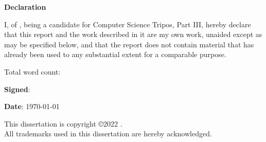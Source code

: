 \newpage
{\Huge \bf Declaration}

\vspace{24pt}

I, \authorname of \authorcollege, being a candidate for Computer
Science Tripos, Part III, hereby declare that this report and the
work described in it are my own work, unaided except as may be
specified below, and that the report does not contain material that
has already been used to any substantial extent for a comparable
purpose.

\vspace{24pt}
Total word count: \wordcount

\vspace{60pt}
\textbf{Signed}: 

\vspace{12pt}
\textbf{Date}: \today


\vfill

This dissertation is copyright \copyright 2022 \authorname. 
\\
All trademarks used in this dissertation are hereby acknowledged.



\newpage
\vspace*{\fill}
